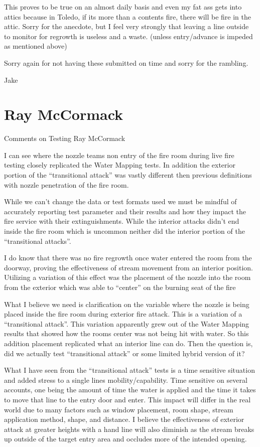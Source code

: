 \documentclass[12pt,oneside]{book}
\begin{document}
\begin{appendix}
This proves to be true on an almost daily basis and even my fat ass gets into attics because in Toledo, if its more than a contents fire, there will be fire in the attic.  Sorry for the anecdote, but I feel very strongly that leaving a line outside to monitor for regrowth is useless and a waste. (unless entry/advance is impeded as mentioned above)


Sorry again for not having these submitted on time and sorry for the rambling.

Jake

\section{Ray McCormack}

Comments on Testing
Ray McCormack

I can see where the nozzle teams non entry of the fire room during live fire testing closely replicated the Water Mapping tests. In addition the exterior portion of the ``transitional attack'' was vastly different then previous definitions with nozzle penetration of the fire room.

While we can't change the data or test formats used we must be mindful of accurately reporting test parameter and their results and how they impact the fire service with their extinguishments. While the interior attacks didn't end inside the fire room which is uncommon neither did the interior portion of the ``transitional attacks''.  

I do know that there was no fire regrowth once water entered the room from the doorway, proving the effectiveness of stream movement from an interior position. Utilizing a variation of this effect was the placement of the nozzle into the room from the exterior which was able to ``center'' on the burning seat of the fire

What I believe we need is clarification on the variable where the nozzle is being placed inside the fire room during exterior fire attack. This is a variation of a ``transitional attack''. This variation apparently grew out of the Water Mapping results that showed how the rooms center was not being hit with water. So this addition placement replicated what an interior line can do. Then the question is, did we actually test ``transitional attack'' or some limited hybrid version of it?

What I have seen from the ``transitional attack'' tests is a time sensitive situation and added stress to a single lines mobility/capability. Time sensitive on several accounts, one being the amount of time the water is applied and the time it takes to move that line to the entry door and enter. This impact will differ in the real world due to many factors such as window placement, room shape, stream application method, shape, and distance. I believe the effectiveness of exterior attack at greater heights with a hand line will also diminish as the stream breaks up outside of the target entry area and occludes more of the intended opening. 


\end{appendix}
\end{document}

